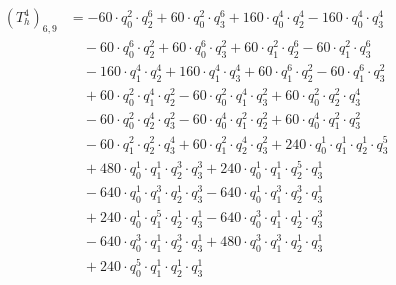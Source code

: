 \begin{align*}(T_{h}^4)_{6,9}&=-60\cdot q_0^{2}\cdot q_2^{6}+60\cdot q_0^{2}\cdot q_3^{6}+160\cdot q_0^{4}\cdot q_2^{4}-160\cdot q_0^{4}\cdot q_3^{4}\\
&\quad -60\cdot q_0^{6}\cdot q_2^{2}+60\cdot q_0^{6}\cdot q_3^{2}+60\cdot q_1^{2}\cdot q_2^{6}-60\cdot q_1^{2}\cdot q_3^{6}\\
&\quad -160\cdot q_1^{4}\cdot q_2^{4}+160\cdot q_1^{4}\cdot q_3^{4}+60\cdot q_1^{6}\cdot q_2^{2}-60\cdot q_1^{6}\cdot q_3^{2}\\
&\quad +60\cdot q_0^{2}\cdot q_1^{4}\cdot q_2^{2}-60\cdot q_0^{2}\cdot q_1^{4}\cdot q_3^{2}+60\cdot q_0^{2}\cdot q_2^{2}\cdot q_3^{4}\\
&\quad -60\cdot q_0^{2}\cdot q_2^{4}\cdot q_3^{2}-60\cdot q_0^{4}\cdot q_1^{2}\cdot q_2^{2}+60\cdot q_0^{4}\cdot q_1^{2}\cdot q_3^{2}\\
&\quad -60\cdot q_1^{2}\cdot q_2^{2}\cdot q_3^{4}+60\cdot q_1^{2}\cdot q_2^{4}\cdot q_3^{2}+240\cdot q_0^{1}\cdot q_1^{1}\cdot q_2^{1}\cdot q_3^{5}\\
&\quad +480\cdot q_0^{1}\cdot q_1^{1}\cdot q_2^{3}\cdot q_3^{3}+240\cdot q_0^{1}\cdot q_1^{1}\cdot q_2^{5}\cdot q_3^{1}\\
&\quad -640\cdot q_0^{1}\cdot q_1^{3}\cdot q_2^{1}\cdot q_3^{3}-640\cdot q_0^{1}\cdot q_1^{3}\cdot q_2^{3}\cdot q_3^{1}\\
&\quad +240\cdot q_0^{1}\cdot q_1^{5}\cdot q_2^{1}\cdot q_3^{1}-640\cdot q_0^{3}\cdot q_1^{1}\cdot q_2^{1}\cdot q_3^{3}\\
&\quad -640\cdot q_0^{3}\cdot q_1^{1}\cdot q_2^{3}\cdot q_3^{1}+480\cdot q_0^{3}\cdot q_1^{3}\cdot q_2^{1}\cdot q_3^{1}\\
&\quad +240\cdot q_0^{5}\cdot q_1^{1}\cdot q_2^{1}\cdot q_3^{1}\end{align*}
